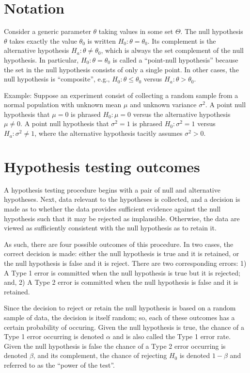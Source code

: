 \documentclass[]{book}
\begin{document}
\section{Notation}\label{notation}

Consider a generic parameter \(\theta\) taking values in some set
\(\Theta\). The null hypothesis \(\theta\) takes exactly the value
\(\theta_0\) is written \(H_0: \theta = \theta_0\). Its complement is
the alternative hypothesis \(H_a: \theta\ne\theta_0\), which is always
the set complement of the null hypothesis. In particular,
\(H_0: \theta = \theta_0\) is called a ``point-null hypothesis'' because
the set in the null hypothesis consists of only a single point. In other
cases, the null hypothesis is ``composite'', e.g.,
\(H_0:\theta \leq \theta_0\) versus \(H_a: \theta > \theta_0\).

Example: Suppose an experiment consist of collecting a random sample
from a normal population with unknown mean \(\mu\) and unknown variance
\(\sigma^2\). A point null hypothesis that \(\mu = 0\) is phrased
\(H_0: \mu = 0\) versus the alternative hypothesis \(\mu \ne 0\). A
point null hypothesis that \(\sigma^2 = 1\) is phrased
\(H_0:\sigma^2=1\) versus \(H_a:\sigma^2 \ne 1\), where the alternative
hypothesis tacitly assumes \(\sigma^2>0\).

\section{Hypothesis testing outcomes}\label{hypothesis-testing-outcomes}

A hypothesis testing procedure begins with a pair of null and
alternative hypotheses. Next, data relevant to the hypotheses is
collected, and a decision is made as to whether the data provides
sufficient evidence against the null hypothesis such that it may be
rejected as implausible. Otherwise, the data are viewed as sufficiently
consistent with the null hypothesis as to retain it.

As such, there are four possible outcomes of this procedure. In two
cases, the correct decision is made: either the null hypothesis is true
and it is retained, or the null hypothesis is false and it is reject.
There are two corresponding errors: 1) A Type 1 error is committed when
the null hypothesis is true but it is rejected; and, 2) A Type 2 error
is committed when the null hypothesis is false and it is retained.

Since the decision to reject or retain the null hypothesis is based on a
random sample of data, the decision is itself random; so, each of these
outcomes has a certain probability of occuring. Given the null
hypothesis is true, the chance of a Type 1 error occurring is denoted
\(\alpha\) and is also called the Type 1 error rate. Given the null
hypothesis is false the chance of a Type 2 error occurring is denoted
\(\beta\), and its complement, the chance of rejecting \(H_0\) is
denoted \(1-\beta\) and referred to as the ``power of the test''.
\end{document}
